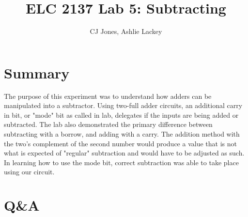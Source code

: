 \documentclass[11pt]{article}
\begin{document}
\title{ELC 2137 Lab 5: Subtracting}
\author{CJ Jones, Ashlie Lackey}

\maketitle


\section*{Summary}

The purpose of this experiment was to understand how adders can be manipulated into a subtractor. Using two-full adder circuits, an additional carry in bit, or "mode" bit as called in lab, delegates if the inputs are being added or subtracted. The lab also demonstrated the primary difference between subtracting with a borrow, and adding with a carry. The addition method with the two's complement of the second number would produce a value that is not what is expected of "regular" subtraction and would have to be adjusted as such. In learning how to use the mode bit, correct subtraction was able to take place using our circuit.  


\section*{Q\&A}
\end{document}
